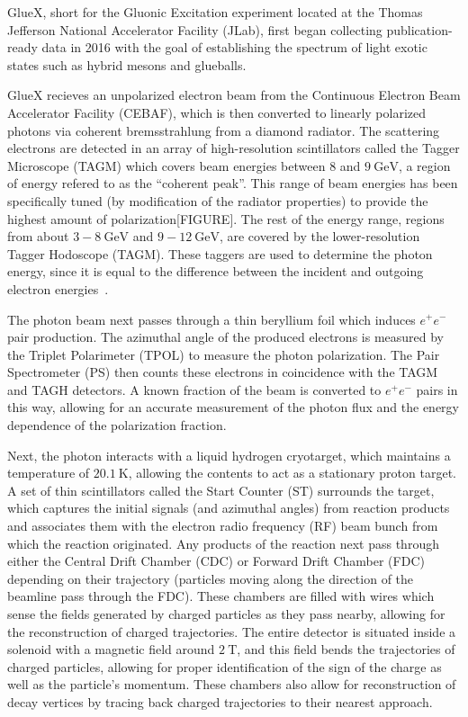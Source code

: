 GlueX, short for the Gluonic Excitation experiment located at the Thomas Jefferson National Accelerator Facility (JLab), first began collecting publication-ready data in 2016 with the goal of establishing the spectrum of light exotic states such as hybrid mesons and glueballs.

GlueX recieves an unpolarized electron beam from the Continuous Electron Beam Accelerator Facility (CEBAF), which is then converted to linearly polarized photons via coherent bremsstrahlung from a diamond radiator. The scattering electrons are detected in an array of high-resolution scintillators called the Tagger Microscope (TAGM) which covers beam energies between $8$ and $\SI{9}{\giga\eV}$, a region of energy refered to as the ``coherent peak''. This range of beam energies has been specifically tuned (by modification of the radiator properties) to provide the highest amount of polarization{\color{red}[FIGURE]}. The rest of the energy range, regions from about $3-\SI{8}{\giga\eV}$ and $9-\SI{12}{\giga\eV}$, are covered by the lower-resolution Tagger Hodoscope (TAGM). These taggers are used to determine the photon energy, since it is equal to the difference between the incident and outgoing electron energies~\cite{adhikari_gluex_2021}.

The photon beam next passes through a thin beryllium foil which induces $e^+e^-$ pair production. The azimuthal angle of the produced electrons is measured by the Triplet Polarimeter (TPOL) to measure the photon polarization. The Pair Spectrometer (PS) then counts these electrons in coincidence with the TAGM and TAGH detectors. A known fraction of the beam is converted to $e^+e^-$ pairs in this way, allowing for an accurate measurement of the photon flux and the energy dependence of the polarization fraction.

Next, the photon interacts with a liquid hydrogen cryotarget, which maintains a temperature of $\SI{20.1}{\K}$, allowing the contents to act as a stationary proton target. A set of thin scintillators called the Start Counter (ST) surrounds the target, which captures the initial signals (and azimuthal angles) from reaction products and associates them with the electron radio frequency (RF) beam bunch from which the reaction originated. Any products of the reaction next pass through either the Central Drift Chamber (CDC) or Forward Drift Chamber (FDC) depending on their trajectory (particles moving along the direction of the beamline pass through the FDC). These chambers are filled with wires which sense the fields generated by charged particles as they pass nearby, allowing for the reconstruction of charged trajectories. The entire detector is situated inside a solenoid with a magnetic field around $\SI{2}{\tesla}$, and this field bends the trajectories of charged particles, allowing for proper identification of the sign of the charge as well as the particle's momentum. These chambers also allow for reconstruction of decay vertices by tracing back charged trajectories to their nearest approach.

